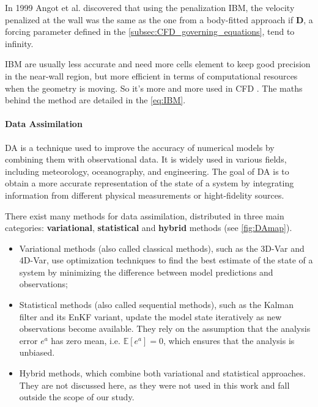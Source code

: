 In 1999 Angot et al. \cite{angotPenalizationMethodTake1999a} discovered that using the penalization IBM, the velocity penalized at the wall was the same as the one from a body-fitted approach if $\mathbf{D}$, a forcing parameter defined in the \autoref{subsec:CFD_governing_equations}, tend to infinity.

IBM are usually less accurate and need more cells element to keep good precision in the near-wall region, but more efficient in terms of computational resources when the geometry is moving. So it's more and more used in CFD \cite{annurev:/content/journals/10.1146/annurev-fluid-120720-022129}. The maths behind the method are detailed in the \autoref{eq:IBM}.


\paragraph{Data Assimilation} \ac{DA} is a technique used to improve the accuracy of numerical models by combining them with observational data\cite{aschDataAssimilationMethods2016}. It is widely used in various fields, including meteorology, oceanography, and engineering. The goal of DA is to obtain a more accurate representation of the state of a system by integrating information from different physical measurements or hight-fidelity sources.


There exist many methods for data assimilation, distributed in three main categories: \textbf{variational}, \textbf{statistical} and \textbf{hybrid} methods (see \autoref{fig:DAmap}).
\begin{itemize}
    \item Variational methods (also called classical methods), such as the 3D-Var and 4D-Var, use optimization techniques to find the best estimate of the state of a system by minimizing the difference between model predictions and observations\cite{rabierVariationalDataAssimilation};
    \item Statistical methods (also called sequential methods), such as the Kalman filter and its \ac{EnKF} variant, update the model state iteratively as new observations become available\cite{aschDataAssimilationMethods2016}. They rely on the assumption that the analysis error $e^a$ has zero mean, i.e. $\mathbb{E}[e^a]=0$, which ensures that the analysis is unbiased.
    \item Hybrid methods, which combine both variational and statistical approaches. They are not discussed here, as they were not used in this work and fall outside the scope of our study.
\end{itemize}



